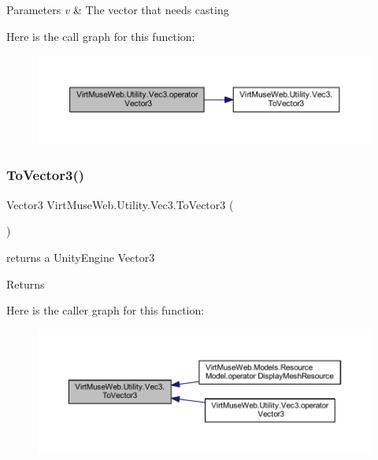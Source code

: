 \begin{DoxyParams}{Parameters}
{\em v} & The vector that needs casting\\
\hline
\end{DoxyParams}
Here is the call graph for this function\+:
\nopagebreak
\begin{figure}[H]
\begin{center}
\leavevmode
\includegraphics[width=350pt]{class_virt_muse_web_1_1_utility_1_1_vec3_af34a58052ccc174dce6803eeabaa9647_cgraph}
\end{center}
\end{figure}
\mbox{\label{class_virt_muse_web_1_1_utility_1_1_vec3_a0328deac658dc5e70dcf34da465d21fc}} 
\subsubsection{\texorpdfstring{To\+Vector3()}{ToVector3()}}
{\footnotesize\ttfamily Vector3 Virt\+Muse\+Web.\+Utility.\+Vec3.\+To\+Vector3 (\begin{DoxyParamCaption}{ }\end{DoxyParamCaption})}



returns a Unity\+Engine Vector3 

\begin{DoxyReturn}{Returns}

\end{DoxyReturn}
Here is the caller graph for this function\+:
\nopagebreak
\begin{figure}[H]
\begin{center}
\leavevmode
\includegraphics[width=350pt]{class_virt_muse_web_1_1_utility_1_1_vec3_a0328deac658dc5e70dcf34da465d21fc_icgraph}
\end{center}
\end{figure}


